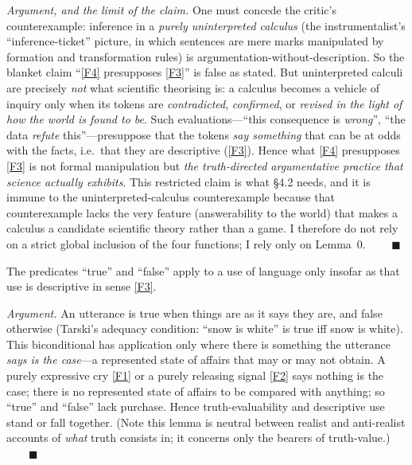\documentclass[12pt]{article}
\begin{document}
\noindent\emph{Argument, and the limit of the claim.} One must concede the
critic's counterexample: inference in a \emph{purely uninterpreted
calculus} (the instrumentalist's ``inference-ticket'' picture, in which
sentences are mere marks manipulated by formation and transformation
rules) is argumentation-without-description. So the blanket claim
``\ref{F4} presupposes \ref{F3}'' is false as stated. But uninterpreted
calculi are precisely \emph{not} what scientific theorising is: a calculus
becomes a vehicle of inquiry only when its tokens are
\emph{contradicted}, \emph{confirmed}, or \emph{revised in the light of
how the world is found to be}. Such evaluations---``this consequence is
\emph{wrong}'', ``the data \emph{refute} this''---presuppose that the
tokens \emph{say something} that can be at odds with the facts, i.e.\ that
they are descriptive (\ref{F3}). Hence what \ref{F4} presupposes \ref{F3}
is not formal manipulation but \emph{the truth-directed argumentative
practice that science actually exhibits}. This restricted claim is what
\S4.2 needs, and it is immune to the uninterpreted-calculus
counterexample because that counterexample lacks the very feature
(answerability to the world) that makes a calculus a candidate scientific
theory rather than a game. I therefore do not rely on a strict global
inclusion of the four functions; I rely only on Lemma~0.
$\qquad\blacksquare$

\begin{description}[leftmargin=1.6em,style=nextline]
\item[Lemma 1 (Truth presupposes description).] The predicates ``true''
and ``false'' apply to a use of language only insofar as that use is
descriptive in sense \ref{F3}.
\end{description}

\noindent\emph{Argument.} An utterance is true when things are as it says
they are, and false otherwise (Tarski's adequacy condition: ``snow is
white'' is true iff snow is white). This biconditional has application
only where there is something the utterance \emph{says is the
case}---a represented state of affairs that may or may not obtain. A
purely expressive cry \ref{F1} or a purely releasing signal \ref{F2} says
nothing is the case; there is no represented state of affairs to be
compared with anything; so ``true'' and ``false'' lack purchase. Hence
truth-evaluability and descriptive use stand or fall together. (Note this
lemma is neutral between realist and anti-realist accounts of \emph{what}
truth consists in; it concerns only the bearers of truth-value.)
$\qquad\blacksquare$
\end{document}
